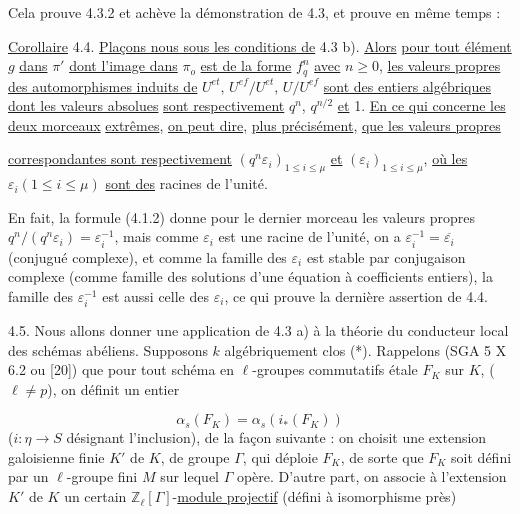 Cela prouve 4.3.2 et achève la démonstration de 4.3, et prouve en même temps :

\underline{Corollaire} 4.4. \underline{Plaçons nous sous les conditions de} 4.3 b). \underline{Alors} \underline{pour tout élément} $g$ \underline{dans} $\pi'$ \underline{dont l'image dans} $\pi_o$ \underline{est de la forme} $f_q^n$ \underline{avec} $n \geq 0$, \underline{les valeurs propres des automorphismes induits de} $U^{et}$, $U^{ef}/U^{et}$, $U/U^{ef}$ \underline{sont des entiers algébriques dont les valeurs absolues} \underline{sont respectivement} $q^n$, $q^{n/2}$ \underline{et} 1. \underline{En ce qui concerne les deux morceaux} \underline{extrêmes}, \underline{on peut dire}, \underline{plus précisément}, \underline{que les valeurs propres}



\underline{correspondantes sont respectivement} $(q^n\varepsilon_i)_{1\leq i\leq\mu}$ \underline{et} $(\varepsilon_i)_{1\leq i\leq\mu}$, \underline{où les} $\varepsilon_i(1\leq i\leq\mu)$ \underline{sont des} racines de l'unité.

En fait, la formule (4.1.2) donne pour le dernier morceau les valeurs propres $q^n/(q^n\varepsilon_i) = \varepsilon_i^{-1}$, mais comme $\varepsilon_i$ est une racine de l'unité, on a $\varepsilon_i^{-1} = \overline{\varepsilon_i}$ (conjugué complexe), et comme la famille des $\varepsilon_i$ est stable par conjugaison complexe (comme famille des solutions d'une équation à coefficients entiers), la famille des $\varepsilon_i^{-1}$ est aussi celle des $\varepsilon_i$, ce qui prouve la dernière assertion de 4.4.

4.5. Nous allons donner une application de 4.3 a) à la théorie du conducteur local des schémas abéliens. Supposons $k$ algébriquement clos (*). Rappelons (SGA 5 X 6.2 ou [20]) que pour tout schéma en $\ell$-groupes commutatifs étale $F_K$ sur $K$, ($\ell \neq p$), on définit un entier

\begin{equation}\tag{4.5.1}
\alpha_s(F_K) = \alpha_s(i_*(F_K))
\end{equation}
($i : \eta \longrightarrow S$ désignant l'inclusion), de la façon suivante : on choisit une extension galoisienne finie $K'$ de $K$, de groupe $\Gamma$, qui déploie $F_K$, de sorte que $F_K$ soit défini par un $\ell$-groupe fini $M$ sur lequel $\Gamma$ opère. D'autre part, on associe à l'extension $K'$ de $K$ un certain $\mathbb{Z}_\ell[\Gamma]$-\underline{module projectif} (défini à isomorphisme près)

